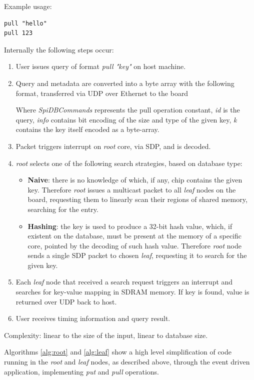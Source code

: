 Example usage:
\begin{lstlisting}
pull "hello"
pull 123
\end{lstlisting}

Internally the following steps occur:
\begin{enumerate}
\item User issues query of format \textit{pull "key"} on host machine.
\item Query and metadata are converted into a byte array with the following format, transferred via UDP over Ethernet to the board %

Where \textit{SpiDBCommands} represents the pull operation constant, \textit{id} is the query, \textit{info} contains bit encoding of the size and type of the given key, \textit{k} contains the key itself encoded as a byte-array.
\item Packet triggers interrupt on \textit{root} core, via SDP, and is decoded.
\item \textit{root} selects one of the following search strategies, based on database type:
\begin{itemize}
	\item \textbf{Naive}: there is no knowledge of which, if any, chip contains the given key. Therefore \textit{root} issues a multicast packet to all \textit{leaf} nodes on the board, requesting them to linearly scan their regions of shared memory, searching for the entry.
	\item \textbf{Hashing}: the key is used to produce a 32-bit hash value, which, if existent on the database, must be present at the memory of a specific core, pointed by the decoding of such hash value. Therefore \textit{root} node sends a single SDP packet to chosen \textit{leaf}, requesting it to search for the given key.
\end{itemize}
\item Each \textit{leaf} node that received a search request triggers an interrupt and searches for key-value mapping in SDRAM memory. If key is found, value is returned over UDP back to host.
\item User receives timing information and query result.
\end{enumerate}

Complexity: linear to the size of the input, linear to database size.

Algorithms \ref{alg:root} and \ref{alg:leaf} show a high level simplification of code running in the \textit{root} and \textit{leaf} nodes, as described above, through the event driven application, implementing \textit{put} and \textit{pull} operations.

